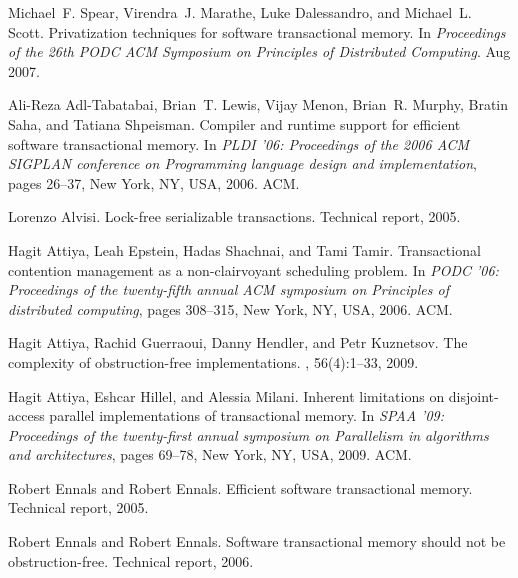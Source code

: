 \begin{thebibliography}{99}
{
Michael~F. Spear, Virendra~J. Marathe, Luke Dalessandro, and Michael~L. Scott.
\newblock Privatization techniques for software transactional memory.
\newblock In {\em Proceedings of the 26th PODC ACM Symposium on Principles of
  Distributed Computing}. Aug 2007.










Ali-Reza Adl-Tabatabai, Brian~T. Lewis, Vijay Menon, Brian~R. Murphy, Bratin
  Saha, and Tatiana Shpeisman.
\newblock Compiler and runtime support for efficient software transactional
  memory.
\newblock In {\em PLDI '06: Proceedings of the 2006 ACM SIGPLAN conference on
  Programming language design and implementation}, pages 26--37, New York, NY,
  USA, 2006. ACM.



Lorenzo Alvisi.
\newblock Lock-free serializable transactions.
\newblock Technical report, 2005.


Hagit Attiya, Leah Epstein, Hadas Shachnai, and Tami Tamir.
\newblock Transactional contention management as a non-clairvoyant scheduling
  problem.
\newblock In {\em PODC '06: Proceedings of the twenty-fifth annual ACM
  symposium on Principles of distributed computing}, pages 308--315, New York,
  NY, USA, 2006. ACM.

Hagit Attiya, Rachid Guerraoui, Danny Hendler, and Petr Kuznetsov.
\newblock The complexity of obstruction-free implementations.
, 56(4):1--33, 2009.

Hagit Attiya, Eshcar Hillel, and Alessia Milani.
\newblock Inherent limitations on disjoint-access parallel implementations of
  transactional memory.
\newblock In {\em SPAA '09: Proceedings of the twenty-first annual symposium on
  Parallelism in algorithms and architectures}, pages 69--78, New York, NY,
  USA, 2009. ACM.











Robert Ennals and Robert Ennals.
\newblock Efficient software transactional memory.
\newblock Technical report, 2005.

Robert Ennals and Robert Ennals.
\newblock Software transactional memory should not be obstruction-free.
\newblock Technical report, 2006.







}
\end{thebibliography}
